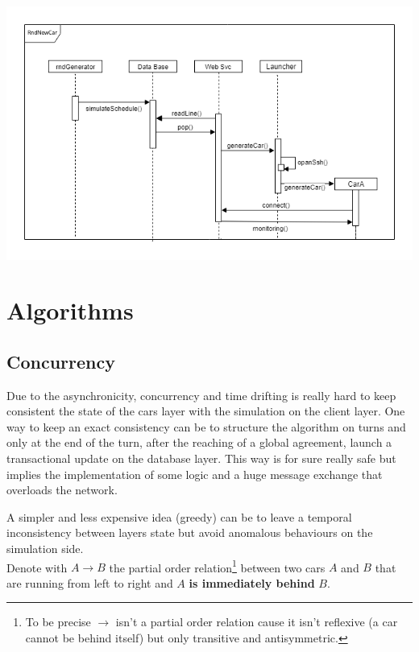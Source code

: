 \begin{center}
    \includegraphics[scale=0.6]{assets/newCarRnd.png}
\end{center}


\section{Algorithms}

\subsection{Concurrency}
Due to the asynchronicity, concurrency and time drifting is really hard 
to keep consistent the state of the cars layer with the simulation 
on the client layer. 
One way to keep an exact consistency can be to structure the algorithm on 
turns and only at the end of the turn, after the reaching of a global agreement,
launch a transactional update on the database layer. 
This way is for sure really safe but implies the implementation of some logic 
and a huge message exchange that overloads the network.

A simpler and less expensive idea (greedy) can be to leave a temporal inconsistency between 
layers state but avoid anomalous behaviours on the simulation side. \\

\noindent
Denote with $A \rightarrow B$ the partial order relation\footnote{
    To be precise $\rightarrow$ isn't a partial order relation cause it isn't 
    reflexive (a car cannot be behind itself) but only transitive and antisymmetric.
} between two cars $A$ and $B$ that are running from left to right and $A$ 
\textbf{is immediately behind} $B$. 

